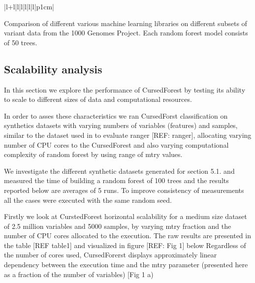 \documentclass[10pt,a4paper]{article}  %
\begin{document}
\begin{table}[!ht]
\begin{minipage}{\textwidth}
\begin{adjustwidth}{-1.25in}{0in}
\begin{tabular}{|l+l|l|l|l|l|l|p{1cm}|}
\end{tabular}
\begin{flushleft} 
Comparison of different various machine learning libraries on different subsets of variant data 
from the 1000 Genomes Project.
Each random forest model consists of 50 trees.
\end{flushleft}
\label{table1}
\end{adjustwidth}
\end{minipage}
\end{table}


\subsection{Scalability analysis}

In this section we explore the performance of CursedForest by testing its ability to scale to different sizes of data and computational resources.

In order to asses these characteristics we ran CursedForst classification on synthetics datasets with varying numbers of variables (features) and samples, similar to the dataset used in to evaluate ranger [REF: ranger], allocating varying number of CPU cores to the CursedForest and also varying computational complexity of random forest by using range of mtry values.


We investigate the different synthetic datasets generated for section 5.1. and measured the time of building a random forest of 100 trees and the results reported below are averages of 5 runs. To improve consistency of measurements all the cases were executed with the same random seed.

Firstly we look at CurstedForest horizontal scalability for a medium size dataset of 2.5 million variables and 5000 samples, by varying mtry fraction and the number of CPU cores allocated to the execution. The raw results are presented in the table [REF table1] and visualized in figure [REF: Fig 1] below
Regardless of the number of cores used, CursedForerst displays approximately  linear dependency between the execution time and the mtry parameter (presented here as a fraction of the number of variables) [Fig 1 a)
\end{document}
